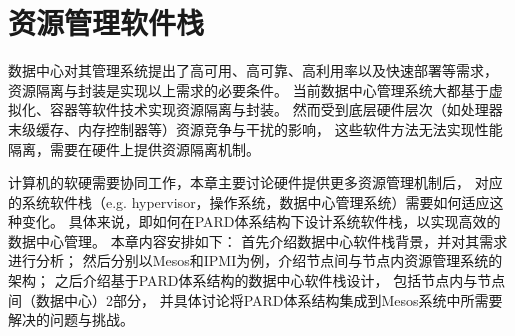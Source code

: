 

\chapter{资源管理软件栈}
\label{chap:prm}


数据中心对其管理系统提出了高可用、高可靠、高利用率以及快速部署等需求，
资源隔离与封装是实现以上需求的必要条件。
当前数据中心管理系统大都基于虚拟化、容器等软件技术实现资源隔离与封装。
然而受到底层硬件层次（如处理器末级缓存、内存控制器等）资源竞争与干扰的影响，
这些软件方法无法实现性能隔离，需要在硬件上提供资源隔离机制。


计算机的软硬需要协同工作，本章主要讨论硬件提供更多资源管理机制后，
对应的系统软件栈（e.g. hypervisor，操作系统，数据中心管理系统）需要如何适应这种变化。
具体来说，即如何在PARD体系结构下设计系统软件栈，以实现高效的数据中心管理。
本章内容安排如下：
首先介绍数据中心软件栈背景，并对其需求进行分析；
然后分别以Mesos和IPMI为例，介绍节点间与节点内资源管理系统的架构；
之后介绍基于PARD体系结构的数据中心软件栈设计，
包括节点内与节点间（数据中心）2部分，
并具体讨论将PARD体系结构集成到Mesos系统中所需要解决的问题与挑战。

